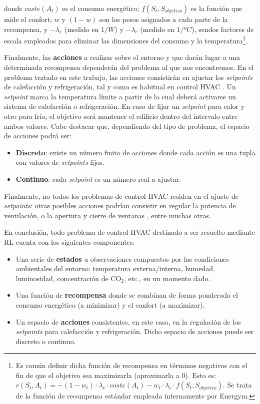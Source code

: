 donde $coste(A_t)$ es el consumo energético; $f(S_t, S_{objetivo})$ es la función que mide el confort; $w$ y $(1-w)$ son los pesos asignados a cada parte de la recompensa, y $-\lambda_e$ (medido en $1/W$) y $-\lambda_c$ (medido en $1/\text{º}C$), sendos factores de escala empleados para eliminar las dimensiones del consumo y la temperatura\footnote{Es común definir dicha función de recompensa en términos negativos con el fin de que el objetivo sea maximizarla (aproximarla a $0$). Esto es: $r(S_t,A_t) = - (1-w_t) \cdot \lambda_e \cdot coste(A_t) - w_t \cdot \lambda_c \cdot f(S_t,S_{objetivo})$. Se trata de la función de recompensa estándar empleada internamente por Energym.}.

Finalmente, las \textbf{acciones} a realizar sobre el entorno y que darán lugar a una determinada recompensa dependerán del problema al que nos encontremos. En el problema tratado en este trabajo, las acciones consistirán en ajustar los \textit{setpoints} de calefacción y refrigeración, tal y como es habitual en control HVAC \cite{vazquez2017balancing, wei2017deep, fazenda2014using}. Un \textit{setpoint} marca la temperatura límite a partir de la cual deberá activarse un sistema de calefacción o refrigeración. En caso de fijar un \textit{setpoint} para calor y otro para frío, el objetivo será mantener el edificio dentro del intervalo entre ambos valores. Cabe destacar que, dependiendo del tipo de problema, el espacio de acciones podrá ser:

\begin{itemize}
    \item \textbf{Discreto}: existe un número finito de acciones donde cada acción es una tupla con valores de \textit{setpoints} fijos.
    \item \textbf{Continuo}: cada \textit{setpoint} es un número real a ajustar.
\end{itemize}

Finalmente, no todos los problemas de control HVAC residen en el ajuste de \textit{setpoints}: otras posibles acciones podrían consistir en regular la potencia de ventilación, o la apertura y cierre de ventanas \cite{chen2018optimal}, entre muchas otras. 

En conclusión, todo problema de control HVAC destinado a ser resuelto mediante RL cuenta con los siguientes componentes:

\begin{itemize}
    \item Una serie de \textbf{estados} u observaciones compuestos por las condiciones ambientales del entorno: temperatura externa/interna, humedad, luminosidad, concentración de CO$_2$, etc., en un momento dado.
    \item Una función de \textbf{recompensa} donde se combinan de forma ponderada el consumo energético (a minimizar) y el confort (a maximizar).
    \item Un espacio de \textbf{acciones} consistentes, en este caso, en la regulación de los \textit{setpoints} para calefacción y refrigeración. Dicho espacio de acciones puede ser discreto o continuo.
\end{itemize}

